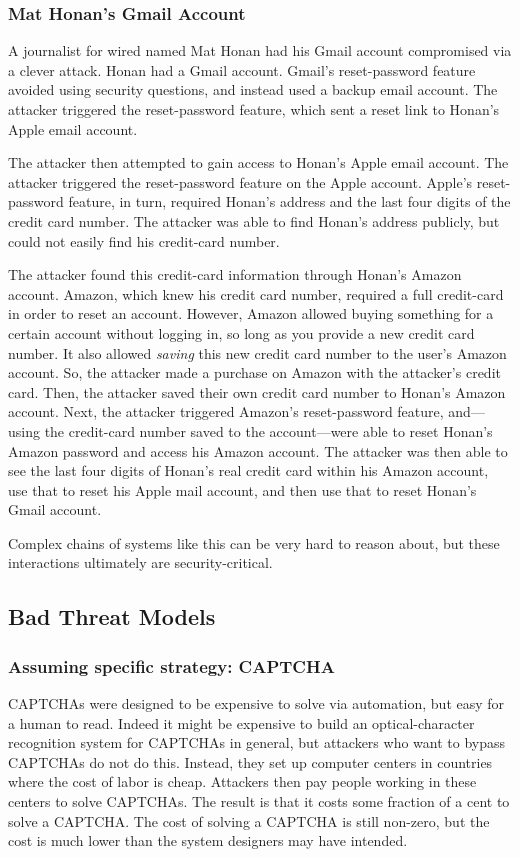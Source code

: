 \subsubsection{Mat Honan's Gmail Account}
A journalist for wired named Mat Honan had his Gmail account compromised via a clever attack.\cite{honan}
Honan had a Gmail account.
Gmail's reset-password feature avoided using security questions, and instead used a backup email account.
The attacker triggered the reset-password feature, which sent a reset link
to Honan's Apple email account.

The attacker then attempted to gain access to Honan's Apple email account.
The attacker triggered the reset-password feature on the Apple account.
Apple's reset-password feature, in turn, required Honan's address and the last four digits of the credit card number.
The attacker was able to find Honan's address publicly, but could not easily find his credit-card number.

The attacker found this credit-card information through Honan's Amazon account.
Amazon, which knew his credit card number, required a full credit-card in order to reset an account.
However, Amazon allowed buying something for a certain account without logging in, 
so long as you provide a new credit card number.
It also allowed \textit{saving} this new credit card number to the user's Amazon account.
So, the attacker made a purchase on Amazon with the attacker's credit card.
Then, the attacker saved their own credit card number to Honan's Amazon account.
Next, the attacker triggered Amazon's reset-password feature, and---using the credit-card
number saved to the account---were able to reset Honan's 
Amazon password and access his Amazon account.
The attacker was then able to see the last four
digits of Honan's real credit card within his
Amazon account, use that to reset his Apple mail
account, and then use that to reset Honan's Gmail
account.

Complex chains of systems like this can be very hard to reason about,
but these interactions ultimately are security-critical.

\subsection{Bad Threat Models}

\subsubsection{Assuming specific strategy: CAPTCHA}
CAPTCHAs were designed to be expensive to
solve via automation, but easy for a human to read.
Indeed it might be expensive to build an optical-character recognition 
system for CAPTCHAs in general, but attackers who want
to bypass CAPTCHAs do not do this.
Instead, they set up computer centers in countries where the cost of
labor is cheap. Attackers then pay people working in these 
centers to solve CAPTCHAs.\cite{motoyama:recaptchas}
The result is that it costs some fraction of
a cent to solve a CAPTCHA. 
The cost of solving a CAPTCHA is still non-zero,
but the cost is much lower than the system designers
may have intended.

